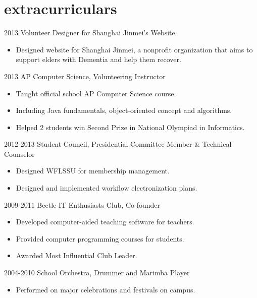 \documentclass[]{friggeri-cv} %
\newenvironment{citemize}{\begin{itemize}[leftmargin=12pt]\vspace{-10pt}}{\end{itemize}}
\begin{document}
\section{extracurriculars}

\begin{entrylist}
\entry
{2013}
{Volunteer Designer for Shanghai Jinmei's Website}
{}
{\begin{citemize}
  \item{Designed website for Shanghai Jinmei, a nonprofit organization that aims to support elders with Dementia and help them recover. }
\end{citemize}}
\entry
{2013}
{AP Computer Science, Volunteering Instructor}
{}
{\begin{citemize}
  \item{Taught official school AP Computer Science course. }
  \item{Including Java fundamentals, object-oriented concept and algorithms. }
  \item{Helped 2 students win Second Prize in National Olympiad in Informatics. }
\end{citemize}}
\entry
{2012-2013}
{Student Council, Presidential Committee Member \& Technical Counselor}
{}
{\begin{citemize}
    \item{Designed WFLSSU for membership management. }
    \item{Designed and implemented workflow electronization plans. }
  \end{citemize}}
\entry
{2009-2011}
{Beetle IT Enthusiasts Club, Co-founder}
{}
{\begin{citemize}
    \item{Developed computer-aided teaching software for teachers. }
    \item{Provided computer programming courses for students. }
    \item{Awarded Most Influential Club Leader. }
  \end{citemize}}

\entry
{2004-2010}
{School Orchestra, Drummer and Marimba Player}
{}
{\begin{citemize}
  \item{Performed on major celebrations and festivals on campus. }
\end{citemize}}
\end{entrylist}
\end{document}
